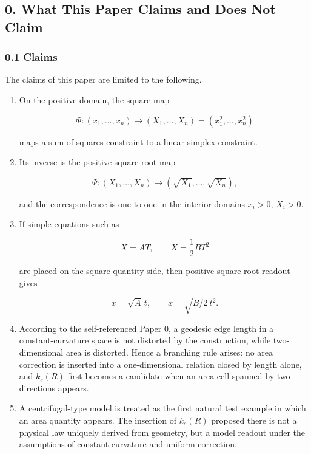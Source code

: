 \documentclass[
]{ltjsarticle}
\begin{document}
\subsection{0. What This Paper Claims and Does Not
Claim}\label{what-this-paper-claims-and-does-not-claim}

\subsubsection{0.1 Claims}\label{claims}

The claims of this paper are limited to the following.

\begin{enumerate}
\def\labelenumi{\arabic{enumi}.}
\item
  On the positive domain, the square map

  \[
  \Phi:(x_1,\ldots,x_n)\mapsto (X_1,\ldots,X_n)=(x_1^2,\ldots,x_n^2)
  \]

  maps a sum-of-squares constraint to a linear simplex constraint.
\item
  Its inverse is the positive square-root map

  \[
  \Psi:(X_1,\ldots,X_n)\mapsto (\sqrt{X_1},\ldots,\sqrt{X_n}),
  \]

  and the correspondence is one-to-one in the interior domains
  \(x_i>0\), \(X_i>0\).
\item
  If simple equations such as

  \[
  X=A T,\qquad X=\frac{1}{2} B T^2
  \]

  are placed on the square-quantity side, then positive square-root
  readout gives

  \[
  x=\sqrt{A}\,t,\qquad x=\sqrt{B/2}\,t^2.
  \]
\item
  According to the self-referenced Paper 0, a geodesic edge length in a
  constant-curvature space is not distorted by the construction, while
  two-dimensional area is distorted. Hence a branching rule arises: no
  area correction is inserted into a one-dimensional relation closed by
  length alone, and \(k_s(R)\) first becomes a candidate when an area
  cell spanned by two directions appears.
\item
  A centrifugal-type model is treated as the first natural test example
  in which an area quantity appears. The insertion of \(k_s(R)\)
  proposed there is not a physical law uniquely derived from geometry,
  but a model readout under the assumptions of constant curvature and
  uniform correction.
\end{enumerate}
\end{document}
